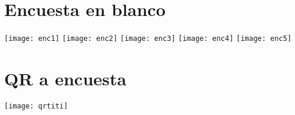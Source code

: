 \section{Encuesta en blanco}

\bigskip
\centering
\texttt{[image: enc1]}
\texttt{[image: enc2]}
\texttt{[image: enc3]}
\texttt{[image: enc4]}
\texttt{[image: enc5]}
\section{QR a encuesta}
\centering
\texttt{[image: qrtiti]}